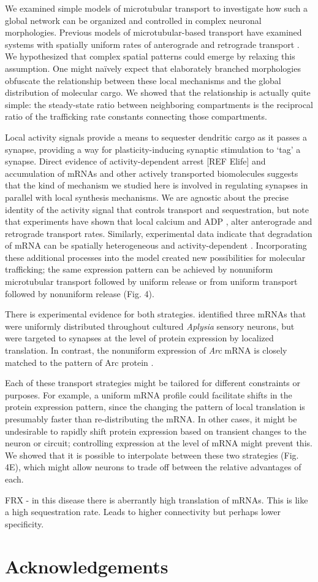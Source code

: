 \documentclass[fleqn,10pt]{wlpeerj}
\begin{document}
We examined simple models of microtubular transport to investigate how such a global network can be organized and controlled in complex neuronal morphologies. Previous models of microtubular-based transport have examined systems with spatially uniform rates of anterograde and retrograde transport \citep{Smith_2001,Bressloff_2006}. We hypothesized that complex spatial patterns could emerge by relaxing this assumption. One might na\"ively expect that elaborately branched morphologies obfuscate the relationship between these local mechanisms and the global distribution of molecular cargo. We showed that the relationship is actually quite simple: the steady-state ratio between neighboring compartments is the reciprocal ratio of the trafficking rate constants connecting those compartments.

Local activity signals provide a means to sequester dendritic cargo as it passes a synapse, providing a way for plasticity-inducing synaptic stimulation to `tag' a synapse. Direct evidence of activity-dependent arrest [REF Elife] and accumulation \citep{Krichevsky_2001,Buxbaum_2014a} of mRNAs and other actively transported biomolecules suggests that the kind of mechanism we studied here is involved in regulating synapses in parallel with local synthesis mechanisms. We are agnostic about the precise identity of the activity signal that controls transport and sequestration, but note that experiments have shown that local calcium \citep{Wang_2009} and ADP \citep{Mironov_2007}, alter anterograde and retrograde transport rates. Similarly, experimental data indicate that degradation of mRNA can be spatially heterogeneous and activity-dependent \citep{Farris_2014}. Incorporating these additional processes into the model created new possibilities for molecular trafficking; the same expression pattern can be achieved by nonuniform microtubular transport followed by uniform release or from uniform transport followed by nonuniform release (Fig. 4).

There is experimental evidence for both strategies. \cite{Kim_2015} identified three mRNAs that were uniformly distributed throughout cultured \textit{Aplysia} sensory neurons, but were targeted to synapses at the level of protein expression by localized translation. In contrast, the nonuniform expression of \textit{Arc} mRNA is closely matched to the pattern of Arc protein \citep{Farris_2014, Steward_2015}. 

Each of these transport strategies might be tailored for different constraints or purposes. For example, a uniform mRNA profile could facilitate shifts in the protein expression pattern, since the changing the pattern of local translation is presumably faster than re-distributing the mRNA. In other cases, it might be undesirable to rapidly shift protein expression based on transient changes to the neuron or circuit; controlling expression at the level of mRNA might prevent this. We showed that it is possible to interpolate between these two strategies (Fig. 4E), which might allow neurons to trade off between the relative advantages of each.

FRX - in this disease there is aberrantly high translation of mRNAs. This is like a high sequestration rate. Leads to higher connectivity but perhaps lower specificity.

\section*{Acknowledgements}


\end{document}
